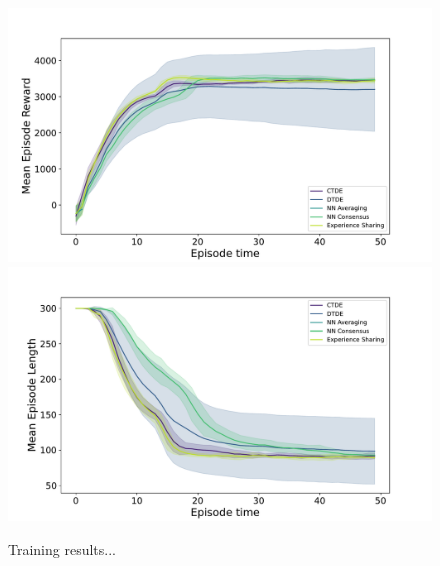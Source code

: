 \documentclass[sigconf]{acmart}
\begin{document}
\begin{figure}
  \centering
  \includegraphics[width=1\linewidth]{figures/episode_reward_mean.pdf}
  \includegraphics[width=1\linewidth]{figures/episode_len_mean.pdf}
  \caption{Training results...}
  \label{fig:results}
\end{figure}
\end{document}
